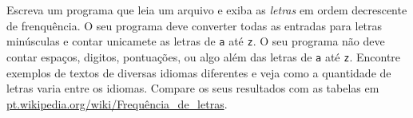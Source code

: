 \begin{ex}
Escreva um programa que leia um arquivo e exiba as {\em letras} em ordem
decrescente de frenquência. O seu programa deve converter todas as entradas
para letras minúsculas e contar unicamete as letras de {\tt a} até {\tt z}. O
seu programa não deve contar espaços, digitos, pontuações, ou algo além das
letras de {\tt a} até {\tt z}. Encontre exemplos de textos de diversas idiomas
diferentes e veja como a quantidade de letras varia entre os idiomas. Compare
os seus resultados com as tabelas em \url{pt.wikipedia.org/wiki/Frequência_de_letras}.


\end{ex}

